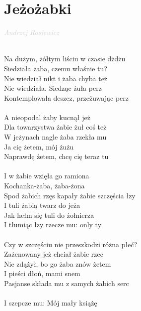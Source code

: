 \documentclass[a5paper, 10pt]{book}
\begin{document}
\section{Jeżożabki}\textcolor{lightgray}{\textit{Andrzej Rosiewicz}}\\~\\
\begin{minipage}[t]{0.8\textwidth}
  Na dużym, żółtym liściu w czasie dżdżu\\
  Siedziała żaba, czemu właśnie tu?\\
  Nie wiedział nikt i żaba chyba też\\
  Nie wiedziała. Siedząc żuła perz\\
  Kontemplowała deszcz, przeżuwając perz\\
  \\
  A nieopodal żaby kucnął jeż\\
  Dla towarzystwa żabie żuł coś też\\
  W jeżynach nagle żaba rzekła mu\\
  Ja cię żetem, mój żużu\\
  Naprawdę żetem, chcę cię teraz tu\\
  \\
  \hspace*{5mm}I w żabie wzięła go ramiona \\
  \hspace*{5mm}Kochanka-żaba, żaba-żona \\
  \hspace*{5mm}Spod żabich rzęs kapały żabie szczęścia łzy\\
  \hspace*{5mm}I tuli żabią twarz do jeża\\
  \hspace*{5mm}Jak hełm się tuli do żołnierza \\
  \hspace*{5mm}I tłumiąc łzy rzecze mu: only ty\\
  \\
  Czy w szczęściu nie przeszkodzi różna płeć?\\
  Zażenowany jeż chciał żabie rzec \\
  Nie zdążył, bo go żaba znów żetem\\
  I pieści dłoń, mami snem \\
  Pasjanse składa mu z samych żabich serc\\
  \\
  \hspace*{5mm}I szepcze mu: Mój mały książę\\

\end{minipage}
\end{document}
